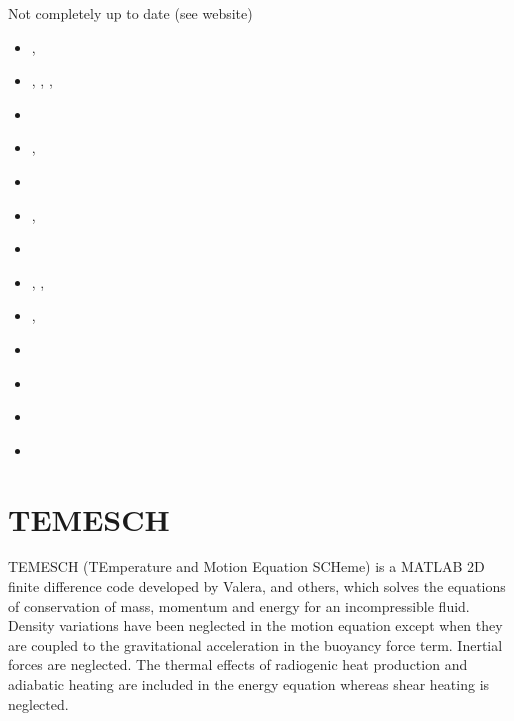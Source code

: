 Not completely up to date (see website)
\begin{small}
\begin{itemize}
\item[\twothousandeleven]     \textcite{qube11}, \textcite{ellw11}
\item[\twothousandtwelve]     \textcite{buit12}, \textcite{tebu12},
                              \textcite{crsg12}, \textcite{grel12}
\item[\twothousandthirteen]   \textcite{ghbu13}
\item[\twothousandfourteen]   \textcite{ghbu14}, \textcite{qubu14}
\item[\twothousandfifteen]    \textcite{nabu15}
\item[\twothousandsixteen]    \textcite{zwsn16}, \textcite{elwr16}
\item[\twothousandseventeen]  \textcite{nabp17}
\item[\twothousandeighteen]   \textcite{tebu18}, \textcite{fade18},  \textcite{weef18}
\item[\twothousandnineteen]   \textcite{elgb19}, \textcite{biem19}
\item[\twothousandtwenty]     \textcite{pena20}
\item[\twothousandtwentytwo]  \textcite{pefb22} 
\item[\twothousandtwentyfour] \textcite{hube24} 
\item[\twothousandtwentyfive] \textcite{erbt25b}
\end{itemize}
\end{small}



\section{TEMESCH} 

TEMESCH (TEmperature
and Motion Equation SCHeme) is a MATLAB 2D finite difference code 
developed by Valera, and others, which
solves the equations of conservation of mass, momentum and energy
for an incompressible ﬂuid. Density variations have been neglected in
the motion equation except when they are coupled to the gravitational
acceleration in the buoyancy force term. Inertial forces are neglected. 
The thermal effects of radiogenic heat production and adiabatic heating 
are included in the energy equation 
whereas shear heating is neglected.


